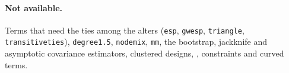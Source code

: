 \paragraph{Not available.} Terms that need the ties among the alters (\texttt{esp}, \texttt{gwesp}, \texttt{triangle}, \texttt{transitiveties}), \texttt{degree1.5}, \texttt{nodemix}, \texttt{mm}, the bootstrap, jackknife and asymptotic covariance estimators, clustered designs, , constraints and curved terms.
